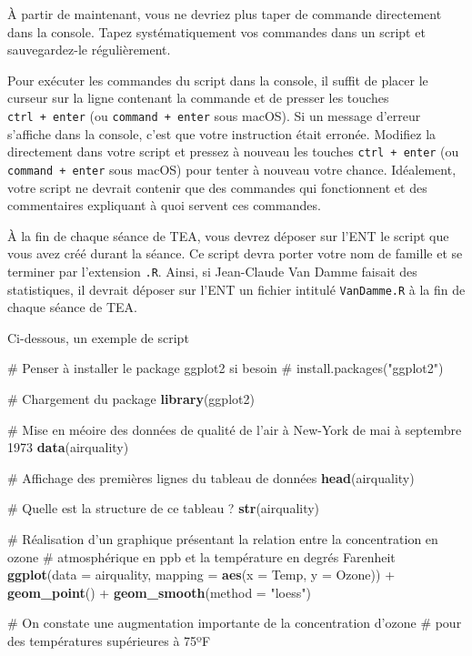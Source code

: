 \documentclass[a4paperpaper,]{article}
\newenvironment{Shaded}{\begin{snugshade}}{\end{snugshade}}
\newcommand{\CommentTok}[1]{\textcolor[rgb]{0.54,0.53,0.53}{#1}}
\newcommand{\DataTypeTok}[1]{\textcolor[rgb]{0.00,0.34,0.68}{#1}}
\newcommand{\KeywordTok}[1]{\textcolor[rgb]{0.12,0.11,0.11}{\textbf{#1}}}
\newcommand{\NormalTok}[1]{\textcolor[rgb]{0.12,0.11,0.11}{#1}}
\newcommand{\OperatorTok}[1]{\textcolor[rgb]{0.12,0.11,0.11}{#1}}
\newcommand{\StringTok}[1]{\textcolor[rgb]{0.75,0.01,0.01}{#1}}
\theoremstyle{definition}
\theoremstyle{definition}
\theoremstyle{definition}
\theoremstyle{remark}
\begin{document}
À partir de maintenant, vous ne devriez plus taper de commande
directement dans la console. Tapez systématiquement vos commandes dans
un script et sauvegardez-le régulièrement.

Pour exécuter les commandes du script dans la console, il suffit de
placer le curseur sur la ligne contenant la commande et de presser les
touches \texttt{ctrl\ +\ enter} (ou \texttt{command\ +\ enter} sous
macOS). Si un message d'erreur s'affiche dans la console, c'est que
votre instruction était erronée. Modifiez la directement dans votre
script et pressez à nouveau les touches \texttt{ctrl\ +\ enter} (ou
\texttt{command\ +\ enter} sous macOS) pour tenter à nouveau votre
chance. Idéalement, votre script ne devrait contenir que des commandes
qui fonctionnent et des commentaires expliquant à quoi servent ces
commandes.

À la fin de chaque séance de TEA, vous devrez déposer sur l'ENT le
script que vous avez créé durant la séance. Ce script devra porter votre
nom de famille et se terminer par l'extension \texttt{.R}. Ainsi, si
Jean-Claude Van Damme faisait des statistiques, il devrait déposer sur
l'ENT un fichier intitulé \texttt{VanDamme.R} à la fin de chaque séance
de TEA.

Ci-dessous, un exemple de script

\begin{Shaded}
\begin{Highlighting}[]
\CommentTok{# Penser à installer le package ggplot2 si besoin}
\CommentTok{# install.packages("ggplot2")}

\CommentTok{# Chargement du package}
\KeywordTok{library}\NormalTok{(ggplot2)}

\CommentTok{# Mise en méoire des données de qualité de l'air à New-York de mai à septembre 1973}
\KeywordTok{data}\NormalTok{(airquality)}

\CommentTok{# Affichage des premières lignes du tableau de données}
\KeywordTok{head}\NormalTok{(airquality)}

\CommentTok{# Quelle est la structure de ce tableau ?}
\KeywordTok{str}\NormalTok{(airquality)}

\CommentTok{# Réalisation d'un graphique présentant la relation entre la concentration en ozone }
\CommentTok{# atmosphérique en ppb et la température en degrés Farenheit}
\KeywordTok{ggplot}\NormalTok{(}\DataTypeTok{data =}\NormalTok{ airquality, }\DataTypeTok{mapping =} \KeywordTok{aes}\NormalTok{(}\DataTypeTok{x =}\NormalTok{ Temp, }\DataTypeTok{y =}\NormalTok{ Ozone)) }\OperatorTok{+}
\StringTok{  }\KeywordTok{geom_point}\NormalTok{() }\OperatorTok{+}
\StringTok{  }\KeywordTok{geom_smooth}\NormalTok{(}\DataTypeTok{method =} \StringTok{"loess"}\NormalTok{)}

\CommentTok{# On constate une augmentation importante de la concentration d'ozone }
\CommentTok{# pour des températures supérieures à 75ºF}
\end{Highlighting}
\end{Shaded}
\end{document}
